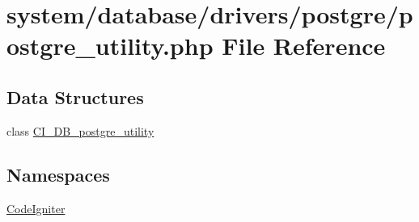 \hypertarget{postgre__utility_8php}{\section{system/database/drivers/postgre/postgre\-\_\-utility.php File Reference}
\label{postgre__utility_8php}
}
\subsection*{Data Structures}
\begin{DoxyCompactItemize}
\item 
class \hyperlink{class_c_i___d_b__postgre__utility}{C\-I\-\_\-\-D\-B\-\_\-postgre\-\_\-utility}
\end{DoxyCompactItemize}
\subsection*{Namespaces}
\begin{DoxyCompactItemize}
\item 
\hyperlink{namespace_code_igniter}{Code\-Igniter}
\end{DoxyCompactItemize}
